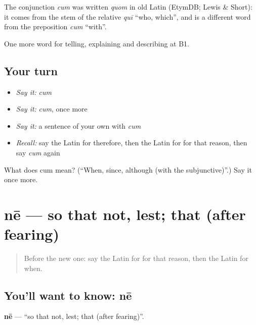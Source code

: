 \begin{cousinweb}
The conjunction \emph{cum} was written \emph{quom} in old Latin (EtymDB; Lewis \& Short): it comes from the stem of the relative \emph{quī} \textquotedblleft{}who, which\textquotedblright{}, and is a different word from the preposition \emph{cum} \textquotedblleft{}with\textquotedblright{}.
\end{cousinweb}

\begin{grammarlens}[title={What you've built}]
One more word for telling, explaining and describing at B1.
\end{grammarlens}

\subsection*{Your turn}
\begin{itemize}
\raggedright
  \item \emph{Say it:} \emph{cum}
  \item \emph{Say it:} \emph{cum}, once more
  \item \emph{Say it:} a sentence of your own with \emph{cum}
  \item \emph{Recall:} say the Latin for therefore, then the Latin for for that reason, then say \emph{cum} again
\end{itemize}

\begin{tcolorbox}[breakable,colback=teal!4,colframe=teal!35!black,title={Before you move on}]
What does cum mean? (\textquotedblleft{}When, since, although (with the subjunctive)\textquotedblright{}.) Say it once more.
\end{tcolorbox}
\section[nē]{nē — so that not, lest; that (after fearing)}

\label{lesson:LA-C367-ne}



\begin{quote}
Before the new one: say the Latin for for that reason, then the Latin for when.
\end{quote}

\subsection*{You'll want to know: nē}
\textbf{nē} — \textquotedblleft{}so that not, lest; that (after fearing)\textquotedblright{}.

